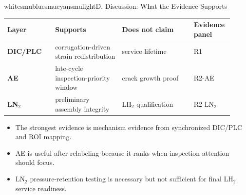 \begin{posterblock}{white}{smublue}{smucyan}{smulight}{D. Discussion: What the Evidence Supports}
\compacttable
\renewcommand{\arraystretch}{1.14}
\begin{tabular}{@{}>{\bfseries}p{0.20\linewidth}p{0.29\linewidth}p{0.30\linewidth}p{0.13\linewidth}@{}}
\toprule
Layer & Supports & Does not claim & Evidence panel \\
\midrule
DIC/PLC & corrugation-driven strain redistribution & service lifetime & R1 \\
AE & late-cycle inspection-priority window & crack growth proof & R2-AE \\
LN$_2$ & preliminary assembly integrity & LH$_2$ qualification & R2-LN$_2$ \\
\bottomrule
\end{tabular}

\vspace{0.9ex}
\begin{itemize}\tightlist
\item The strongest evidence is mechanism evidence from synchronized DIC/PLC and ROI mapping.
\item AE is useful after relabeling because it ranks when inspection attention should focus.
\item LN$_2$ pressure-retention testing is necessary but not sufficient for final LH$_2$ service readiness.
\end{itemize}
\end{posterblock}
